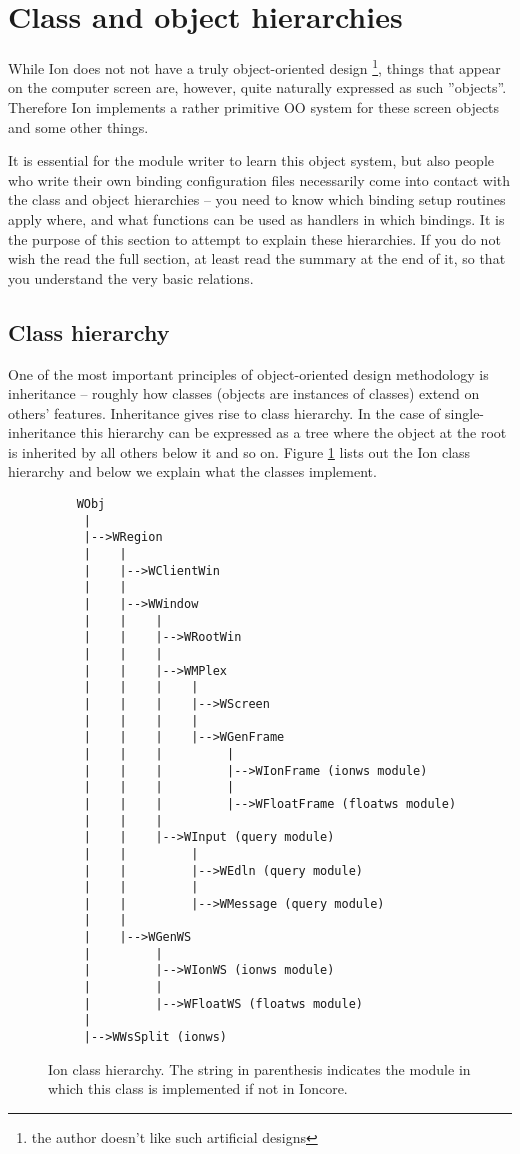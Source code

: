 
\section{Class and object hierarchies}
\label{sec:objects}

While Ion does not not have a truly object-oriented design
\footnote{the author doesn't like such artificial designs},
things that appear on the computer screen are, however, quite
naturally expressed as such ''objects''. Therefore Ion implements
a rather primitive OO system for these screen objects and some
other things. 

It is essential for the module writer to learn this object
system, but also people who write their own binding configuration files
necessarily come into contact with the class and object hierarchies
-- you need to know which binding setup routines apply where, 
and what functions can be used as handlers in which bindings.
It is the purpose of this section to attempt to explain these 
hierarchies. If you do not wish the read the full section, at least
read the summary at the end of it, so that you understand the very
basic relations.


\subsection{Class hierarchy}

One of the most important principles of object-oriented design methodology
is inheritance -- roughly how classes (objects are instances of classes)
extend on others' features. Inheritance gives rise to class hierarchy.
In the case of single-inheritance this hierarchy can be expressed as a
tree where the object at the root is inherited by all others below it
and so on. Figure \ref{fig:classhierarchy} lists out the Ion class 
hierarchy and below we explain what the classes implement. 

\begin{figure}
\begin{htmlonly}
\docode %
\end{htmlonly}
\begin{verbatim}
    WObj
     |
     |-->WRegion
     |    |
     |    |-->WClientWin
     |    |
     |    |-->WWindow
     |    |    |
     |    |    |-->WRootWin
     |    |    |
     |    |    |-->WMPlex
     |    |    |    |
     |    |    |    |-->WScreen
     |    |    |    |
     |    |    |    |-->WGenFrame
     |    |    |         |
     |    |    |         |-->WIonFrame (ionws module)
     |    |    |         |
     |    |    |         |-->WFloatFrame (floatws module)
     |    |    |
     |    |    |-->WInput (query module)
     |    |         |
     |    |         |-->WEdln (query module)
     |    |         |
     |    |         |-->WMessage (query module)
     |    |
     |    |-->WGenWS
     |         |
     |         |-->WIonWS (ionws module)
     |         |
     |         |-->WFloatWS (floatws module)
     |
     |-->WWsSplit (ionws)
\end{verbatim}
\caption{Ion class hierarchy. The string in parenthesis indicates
  the module in which this class is implemented if not in Ioncore.}
\label{fig:classhierarchy}
\end{figure}

